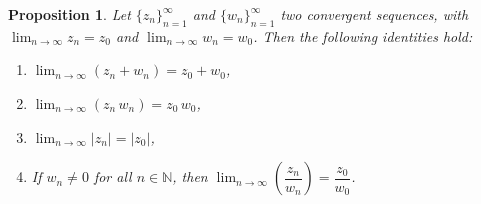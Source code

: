 \documentclass{amsart}
\newtheorem{prop}{Proposition}
\begin{document}
\begin{prop}
Let \(\{z_n\}_{n=1}^{\infty}\) and \(\{w_n\}_{n=1}^{\infty}\) two convergent sequences, with \(\lim_{n\to\infty}z_n = z_0\) and \(\lim_{n\to\infty}w_n = w_0\). Then the following identities hold:

\begin{enumerate}
\item \(\displaystyle\lim_{n\to\infty}(z_n + w_n) = z_0 + w_0\),
\item \(\displaystyle\lim_{n\to\infty}(z_n \, w_n) = z_0 \, w_0\),
\item \(\displaystyle\lim_{n\to\infty}|z_n| = |z_0|\),
\item If \(w_n \neq 0\) for all \(n\in \mathbb{N}\), then \(\displaystyle\lim_{n\to\infty}\left(\dfrac{z_n}{w_n}\right) = \dfrac{z_0}{w_0}\).
\end{enumerate}
\end{prop}
\end{document}
